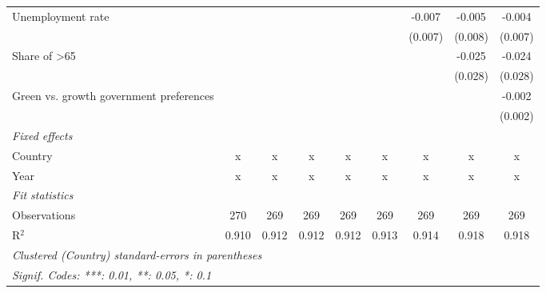 \begin{table}[htbp]
\begin{tabular}{lcccccccc}
      Unemployment rate                                              &         &         &         &         &         & -0.007  & -0.005  & -0.004\\   
                                                                     &         &         &         &         &         & (0.007) & (0.008) & (0.007)\\   
      Share of >65                                                   &         &         &         &         &         &         & -0.025  & -0.024\\   
                                                                     &         &         &         &         &         &         & (0.028) & (0.028)\\   
      Green vs. growth government preferences                        &         &         &         &         &         &         &         & -0.002\\   
                                                                     &         &         &         &         &         &         &         & (0.002)\\   
      \emph{Fixed effects}\\
      Country                                                        & x       & x       & x       & x       & x       & x       & x       & x\\  
      Year                                                           & x       & x       & x       & x       & x       & x       & x       & x\\  
      \midrule \emph{Fit statistics}\\
      Observations                                                   & 270     & 269     & 269     & 269     & 269     & 269     & 269     & 269\\  
      R$^2$                                                          & 0.910   & 0.912   & 0.912   & 0.912   & 0.913   & 0.914   & 0.918   & 0.918\\  
      \midrule
      \multicolumn{9}{l}{\emph{Clustered (Country) standard-errors in parentheses}}\\
      \multicolumn{9}{l}{\emph{Signif. Codes: ***: 0.01, **: 0.05, *: 0.1}}\\
   \end{tabular}
\end{table}


